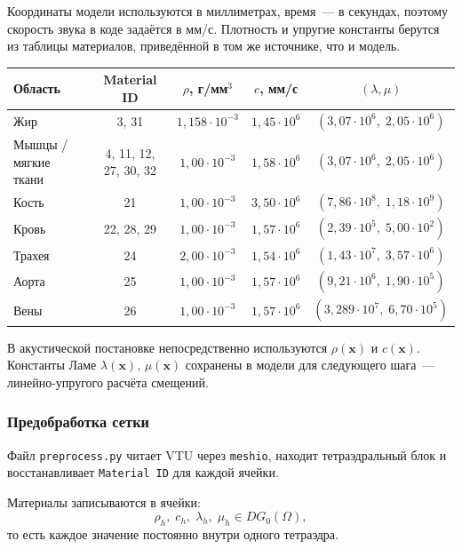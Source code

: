 Координаты модели используются в миллиметрах, время~--- в секундах,
поэтому скорость звука в коде задаётся в мм/с. Плотность и упругие
константы берутся из таблицы материалов, приведённой в том же источнике,
что и модель.

\begin{center}
\begin{tabular}{lcccc}
  \hline
  Область & Material ID & $\rho$, г/мм$^3$ & $c$, мм/с
          & $(\lambda, \mu)$ \\
  \hline
  Жир & 3, 31 & $1{,}158\cdot 10^{-3}$ & $1{,}45\cdot 10^6$
      & $(3{,}07\cdot 10^6,\;2{,}05\cdot 10^6)$ \\
  Мышцы / мягкие ткани & 4, 11, 12, 27, 30, 32
      & $1{,}00\cdot 10^{-3}$ & $1{,}58\cdot 10^6$
      & $(3{,}07\cdot 10^6,\;2{,}05\cdot 10^6)$ \\
  Кость & 21 & $1{,}00\cdot 10^{-3}$ & $3{,}50\cdot 10^6$
      & $(7{,}86\cdot 10^8,\;1{,}18\cdot 10^9)$ \\
  Кровь & 22, 28, 29 & $1{,}00\cdot 10^{-3}$ & $1{,}57\cdot 10^6$
      & $(2{,}39\cdot 10^5,\;5{,}00\cdot 10^2)$ \\
  Трахея & 24 & $2{,}00\cdot 10^{-3}$ & $1{,}54\cdot 10^6$
      & $(1{,}43\cdot 10^7,\;3{,}57\cdot 10^6)$ \\
  Аорта & 25 & $1{,}00\cdot 10^{-3}$ & $1{,}57\cdot 10^6$
      & $(9{,}21\cdot 10^6,\;1{,}90\cdot 10^5)$ \\
  Вены & 26 & $1{,}00\cdot 10^{-3}$ & $1{,}57\cdot 10^6$
      & $(3{,}289\cdot 10^7,\;6{,}70\cdot 10^5)$ \\
  \hline
\end{tabular}
\end{center}

В акустической постановке непосредственно используются $\rho(\mathbf{x})$
и $c(\mathbf{x})$. Константы Ламе $\lambda(\mathbf{x})$, $\mu(\mathbf{x})$
сохранены в модели для следующего шага~--- линейно-упругого расчёта
смещений.

\subsubsection{Предобработка сетки}

Файл \texttt{preprocess.py} читает VTU через \texttt{meshio}, находит
тетраэдральный блок и восстанавливает \texttt{Material ID} для каждой
ячейки.

Материалы записываются в ячейки:
\begin{equation}
  \rho_h,\; c_h,\; \lambda_h,\; \mu_h \in DG_0(\Omega),
\end{equation}
то есть каждое значение постоянно внутри одного тетраэдра.

